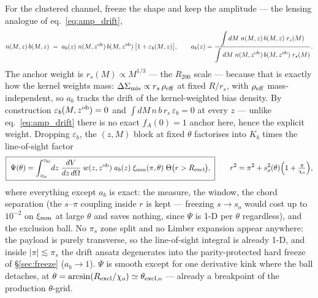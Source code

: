 \documentclass[a4paper, 11pt]{article}
\newcommand{\zob}{z^{\rm ob}}
\newcommand{\ximm}{\xi_{\rm mm}}
\newcommand{\Rex}{R_{\rm excl}}
\newcommand{\pis}{\pi_s}
\newcommand{\DSmis}{\Delta\Sigma_{\rm mis}}
\begin{document}
For the clustered channel, freeze the shape and keep the
amplitude --- the lensing analogue of eq.~\eqref{eq:amp_drift},
\begin{equation}
n(M,z)\,b(M,z) \;=\; a_b(z)\;
n(M,\zob)\,b(M,\zob)\,\big[1+\varepsilon_b(M,z)\big],
\qquad
a_b(z) =
\frac{\displaystyle\int dM\; n(M,z)\,b(M,z)\; r_s(M)}
     {\displaystyle\int dM\; n(M,\zob)\,b(M,\zob)\; r_s(M)}.
\label{eq:nb_drift}
\end{equation}
The anchor weight is $r_s(M)\propto M^{1/3}$ --- the $R_{200}$
scale --- because that is exactly how the kernel weights mass:
$\DSmis \propto r_s\,\rho_{\rm eff}$ at fixed $R/r_s$, with
$\rho_{\rm eff}$ mass-independent, so $a_b$ tracks the drift of
the kernel-weighted bias density. By construction
$\varepsilon_b(M,\zob)=0$ and
$\int dM\,n\,b\,r_s\,\varepsilon_b = 0$ at every $z$ --- unlike
eq.~\eqref{eq:amp_drift} there is no exact $f_A(0)=1$ anchor
here, hence the explicit weight. Dropping $\varepsilon_b$, the
$(z,M)$ block at fixed $\theta$ factorises into $K_b$ times the
line-of-sight factor
\begin{equation}
\boxed{\;
\Psi(\theta) =
\int_{z_{\rm lo}}^{z_{\rm hi}}\! dz\;
\frac{dV}{dz\,d\Omega}\;
w(z,\zob)\; a_b(z)\;
\ximm(\pi,\theta)\;
\Theta\big(r > \Rex\big),
\;}
\qquad
r^2 = \pi^2 + s_o^2(\theta)\Big(1+\tfrac{\pi}{\chi_o}\Big),
\label{eq:Psi_lens}
\end{equation}
where everything except $a_b$ is exact: the measure, the window,
the chord separation (the $s$--$\pi$ coupling inside $r$ is kept
--- freezing $s\to s_o$ would cost up to $10^{-2}$ on $\ximm$ at
large $\theta$ and saves nothing, since $\Psi$ is 1-D per
$\theta$ regardless), and the exclusion ball. No $\pis$ zone
split and no Limber expansion appear anywhere: the payload is
purely transverse, so the line-of-sight integral is already 1-D,
and inside $|\pi|\lesssim\pis$ the drift ansatz degenerates into
the parity-protected hard freeze of \S\ref{sec:freeze}
($a_b\to1$). $\Psi$ is smooth except for one derivative kink
where the ball detaches, at
$\theta = \arcsin(\Rex/\chi_o) \simeq \theta_{\rm excl,o}$ ---
already a breakpoint of the production $\theta$-grid.
\end{document}
